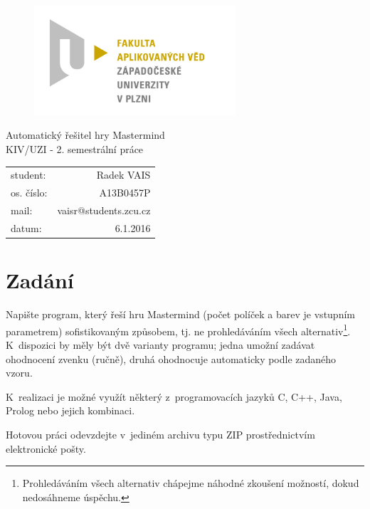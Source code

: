 \documentclass[12pt, a4paper]{article}
\begin{document}
\begin{figure}[h!]
\centering
\includegraphics[bb= 0 0 820 445 , width=75mm]{favlogo.jpg}
\end{figure}

\vspace{5cm}

{\centering
{\huge Automatický řešitel hry Mastermind}\\[1em]
{\large KIV/UZI - 2. semestrální práce}\\[7,5cm]
}

\begin{tabular}{l r}
student: & Radek VAIS\\
os. číslo: & A13B0457P\\
mail: & vaisr@students.zcu.cz\\
datum: & 6.1.2016\\
\end{tabular}

\thispagestyle{empty}
\newpage

\section{Zadání} %

Napište program, který řeší hru Mastermind (počet políček a barev je vstupním parametrem) sofistikovaným způsobem,
 tj. ne prohledáváním všech alternativ\footnote{Prohledáváním všech alternativ chápejme náhodné zkoušení možností, dokud nedosáhneme úspěchu.}. K~dispozici  by  měly být dvě varianty programu; jedna umožní zadávat ohodnocení 
zvenku (ručně), druhá ohodnocuje automaticky podle zadaného vzoru.  

K~realizaci je možné využít některý z~programovacích jazyků C, C++, Java, Prolog nebo jejich kombinaci. 

Hotovou práci odevzdejte v~jediném archivu typu ZIP prostřednictvím elektronické pošty.
\end{document}
